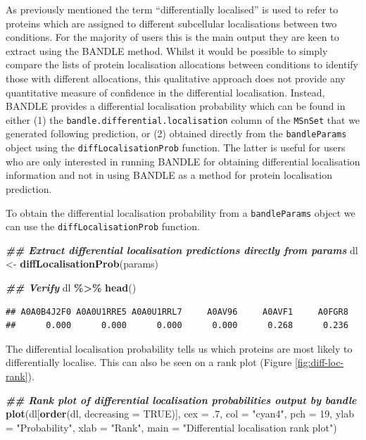 \documentclass[9pt,a4paper,]{extarticle}
\newenvironment{Shaded}{\begin{snugshade}}{\end{snugshade}}
\newcommand{\AttributeTok}[1]{\textcolor[rgb]{0.13,0.29,0.53}{#1}}
\newcommand{\ConstantTok}[1]{\textcolor[rgb]{0.56,0.35,0.01}{#1}}
\newcommand{\DecValTok}[1]{\textcolor[rgb]{0.00,0.00,0.81}{#1}}
\newcommand{\DocumentationTok}[1]{\textcolor[rgb]{0.56,0.35,0.01}{\textbf{\textit{#1}}}}
\newcommand{\FunctionTok}[1]{\textcolor[rgb]{0.13,0.29,0.53}{\textbf{#1}}}
\newcommand{\NormalTok}[1]{#1}
\newcommand{\OtherTok}[1]{\textcolor[rgb]{0.56,0.35,0.01}{#1}}
\newcommand{\SpecialCharTok}[1]{\textcolor[rgb]{0.81,0.36,0.00}{\textbf{#1}}}
\newcommand{\StringTok}[1]{\textcolor[rgb]{0.31,0.60,0.02}{#1}}
\begin{document}
As previously mentioned the term ``differentially localised'' is used to refer
to proteins which are assigned to different subcellular localisations between
two conditions. For the majority of users this is the main output they are keen
to extract using the BANDLE method. Whilst it would be possible to simply
compare the lists of protein localisation allocations between conditions to
identify those with different allocations, this qualitative approach does not
provide any quantitative measure of confidence in the differential localisation.
Instead, BANDLE provides a differential localisation probability which
can be found in either (1) the \texttt{bandle.differential.localisation} column of the
\texttt{MSnSet} that we generated following prediction, or (2) obtained directly from
the \texttt{bandleParams} object using the \texttt{diffLocalisationProb} function. The latter
is useful for users who are only interested in running BANDLE for obtaining
differential localisation information and not in using BANDLE as a method for
protein localisation prediction.

To obtain the differential localisation probability from a \texttt{bandleParams}
object we can use the \texttt{diffLocalisationProb} function.

\begin{Shaded}
\begin{Highlighting}[]
\DocumentationTok{\#\# Extract differential localisation predictions directly from params}
\NormalTok{dl }\OtherTok{\textless{}{-}} \FunctionTok{diffLocalisationProb}\NormalTok{(params)}

\DocumentationTok{\#\# Verify}
\NormalTok{dl }\SpecialCharTok{\%\textgreater{}\%} 
  \FunctionTok{head}\NormalTok{()}
\end{Highlighting}
\end{Shaded}

\begin{verbatim}
## A0A0B4J2F0 A0A0U1RRE5 A0A0U1RRL7     A0AV96     A0AVF1     A0FGR8 
##      0.000      0.000      0.000      0.000      0.268      0.236
\end{verbatim}

The differential localisation probability tells us which proteins are most
likely to differentially localise. This can also be seen on a rank plot (Figure \ref{fig:diff-loc-rank}).

\begin{Shaded}
\begin{Highlighting}[]
\DocumentationTok{\#\# Rank plot of differential localisation probabilities output by bandle}
\FunctionTok{plot}\NormalTok{(dl[}\FunctionTok{order}\NormalTok{(dl, }\AttributeTok{decreasing =} \ConstantTok{TRUE}\NormalTok{)], }\AttributeTok{cex =}\NormalTok{ .}\DecValTok{7}\NormalTok{,}
     \AttributeTok{col =} \StringTok{"cyan4"}\NormalTok{, }\AttributeTok{pch =} \DecValTok{19}\NormalTok{, }\AttributeTok{ylab =} \StringTok{"Probability"}\NormalTok{,}
     \AttributeTok{xlab =} \StringTok{"Rank"}\NormalTok{, }\AttributeTok{main =} \StringTok{"Differential localisation rank plot"}\NormalTok{)}
\end{Highlighting}
\end{Shaded}
\end{document}
